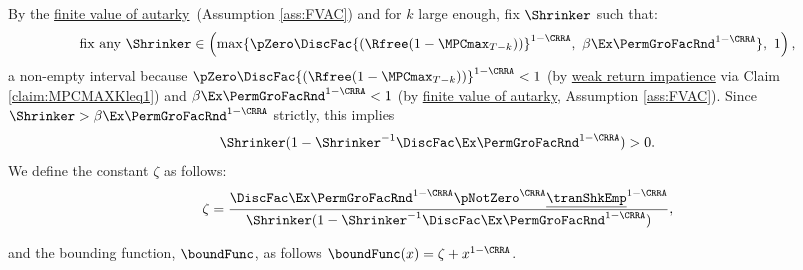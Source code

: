 \documentclass[\econtexRoot/BufferStockTheory]{subfiles}
\begin{document}
\begin{remark}\label{rem:shnkrdef}
By the \hyperlink{FVAC}{finite value of autarky}~(Assumption \ref{ass:FVAC}) and for $k$ large enough, fix $\Shrinker$ such that:
%
\begin{equation}\label{eq:shnkrdef}
\text{fix any } \Shrinker \in \left(\max\{\pZero \DiscFac {(\Rfree (1-\MPCmax_{T-k}))}^{1-\CRRA},\ \beta\Ex\PermGroFacRnd^{1-\CRRA}\},\ 1\right),
\end{equation}
%
a non-empty interval because $\pZero \DiscFac {(\Rfree (1-\MPCmax_{T-k}))}^{1-\CRRA}<1$ (by \hyperlink{WRIC}{weak return impatience} via Claim \ref{claim:MPCMAXKleq1}) and $\beta\Ex\PermGroFacRnd^{1-\CRRA}<1$ (by \hyperlink{FVAC}{finite value of autarky}, Assumption \ref{ass:FVAC}).
Since $\Shrinker>\beta\Ex\PermGroFacRnd^{1-\CRRA}$ strictly, this implies
%
\begin{equation}\label{eq:shrnkrCond}
\Shrinker(1- \Shrinker^{-1}\DiscFac \Ex\PermGroFacRnd^{1-\CRRA })>0.
\end{equation}
%
We define the constant $\zeta$ as follows:
%
\begin{equation}\label{eq:Mbarddef}
\zeta = \frac{\DiscFac \Ex \PermGroFacRnd^{1-\CRRA }\pNotZero^{\CRRA}\underline{\tranShkEmp}^{1-\CRRA}}{\Shrinker(1- \Shrinker^{-1}\DiscFac \Ex \PermGroFacRnd^{1-\CRRA })}, 
\end{equation}

and the bounding function, $\boundFunc$, as follows $\boundFunc(x) = \zeta +  x^{1-\CRRA}$.


\end{remark}
\end{document}
